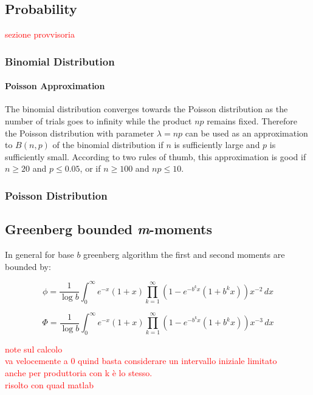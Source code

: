 \begin{appendices}

\chapter[Appendix]{}

\section{Probability}
\textcolor{red}{sezione provvisoria}
\subsection{Binomial Distribution}
\subsubsection{Poisson Approximation}
The binomial distribution converges towards the Poisson distribution as the number of trials goes to infinity while the product $np$ remains fixed. Therefore the Poisson distribution with parameter $\lambda = np$ can be used as an approximation to $B(n, p)$ of the binomial distribution if $n$ is sufficiently large and $p$ is sufficiently small. According to two rules of thumb, this approximation is good if $n \geq 20$ and $p \leq 0.05$, or if $n \geq 100$ and $np \leq 10$.
\subsection{Poisson Distribution}

\section{Greenberg bounded \emph{m}-moments}

In general for base $b$ greenberg algorithm the first and second moments are bounded by:

\begin{equation}
\phi= \frac{1}{\log b} \int_{0}^{\infty} \! e^{-x}(1+x) \prod_{k=1}^{\infty}(1-e^{-b^{k}x}(1+b^{k}x))x^{-2} \, dx
\end{equation}

\begin{equation}
\Phi= \frac{1}{\log b} \int_{0}^{\infty} \! e^{-x}(1+x) \prod_{k=1}^{\infty}(1-e^{-b^{k}x}(1+b^{k}x))x^{-3} \, dx
\end{equation}

\textcolor{red}{note sul calcolo\\ va velocemente a 0 quind basta considerare un intervallo iniziale  limitato\\
anche per produttoria con k è lo stesso.\\ risolto con quad matlab}


\end{appendices}
